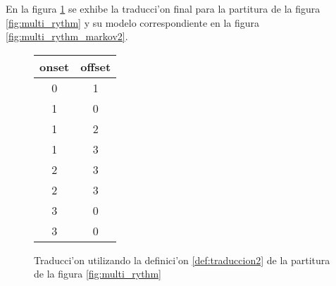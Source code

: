 En la figura \ref{fig:multi_rythm_translation2} se exhibe la traducci'on final para la 
partitura de la figura \ref{fig:multi_rythm} y su modelo correspondiente en la figura \ref{fig:multi_rythm_markov2}.

\begin{figure}[!h]
\begin{center}
\begin{tabular}{c | c} 
onset & offset \\
\hline
0 & 1 \\
1 & 0 \\
1 & 2 \\
1 & 3 \\
2 & 3 \\
2 & 3 \\
3 & 0 \\
3 & 0 \\
\end{tabular}
\caption{ Traducci'on utilizando la definici'on \ref{def:traduccion2} de la partitura de la figura \ref{fig:multi_rythm}}
\label{fig:multi_rythm_translation2}

\end{center}
\end{figure}

\begin{imagen}
    \width{7cm}
\end{imagen}
